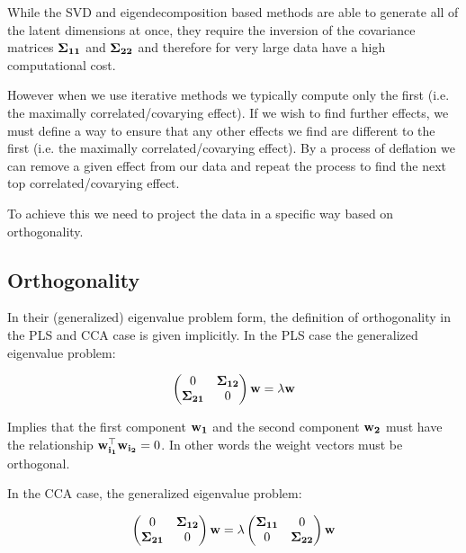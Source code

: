 While the SVD and eigendecomposition based methods are able to generate all of the latent dimensions at once, they require the inversion of the covariance matrices $\bold{\Sigma_{11}}$ and $\bold{\Sigma_{22}}$ and therefore for very large data have a high computational cost.

However when we use iterative methods we typically compute only the first (i.e. the maximally correlated/covarying effect). If we wish to find further effects, we must define a way to ensure that any other effects we find are different to the first (i.e. the maximally correlated/covarying effect). By a process of deflation we can remove a given effect from our data and repeat the process to find the next top correlated/covarying effect.

To achieve this we need to project the data in a specific way based on orthogonality.

\subsection{Orthogonality}

In their (generalized) eigenvalue problem form, the definition of orthogonality in the PLS and CCA case is given implicitly. In the PLS case the generalized eigenvalue problem:

\begin{align}
    \begin{pmatrix}
        0                  & \bold{\Sigma_{12}} \\
        \bold{\Sigma_{21}} & 0
    \end{pmatrix}
    \bold{w}
    =
    \lambda
    \bold{w}
\end{align}

Implies that the first component $\bold{w_1}$ and the second component $\bold{w_2}$ must have the relationship $\bold{w_{i_1}^{\top} w_{i_2}}=0$. In other words the weight vectors must be orthogonal.

In the CCA case, the generalized eigenvalue problem:

\begin{align}
    \begin{pmatrix}
        0                  & \bold{\Sigma_{12}} \\
        \bold{\Sigma_{21}} & 0
    \end{pmatrix}
    \bold{w}
    =
    \lambda
    \begin{pmatrix}
        \bold{\Sigma_{11}} & 0                  \\
        0                  & \bold{\Sigma_{22}}
    \end{pmatrix}
    \bold{w}
\end{align}

